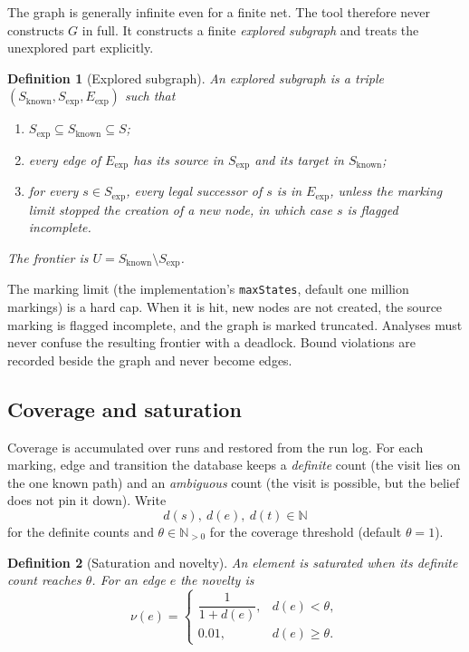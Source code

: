 \documentclass[11pt,a4paper]{article}
\newtheorem{definition}{Definition}[section]
\newcommand{\N}{\mathbb{N}}
\newcommand{\Npos}{\mathbb{N}_{>0}}
\begin{document}
The graph is generally infinite even for a finite net.  The tool therefore
never constructs $G$ in full.  It constructs a finite \emph{explored
subgraph} and treats the unexplored part explicitly.

\begin{definition}[Explored subgraph]\label{def:explored}
An explored subgraph is a triple $(S_{\mathrm{known}},S_{\mathrm{exp}},E_{\mathrm{exp}})$
such that
\begin{enumerate}[label=(\roman*),leftmargin=2.2em]
  \item $S_{\mathrm{exp}}\subseteq S_{\mathrm{known}}\subseteq S$;
  \item every edge of $E_{\mathrm{exp}}$ has its source in $S_{\mathrm{exp}}$
        and its target in $S_{\mathrm{known}}$;
  \item for every $s\in S_{\mathrm{exp}}$, every legal successor of $s$ is in
        $E_{\mathrm{exp}}$, unless the marking limit stopped the creation of
        a new node, in which case $s$ is flagged \emph{incomplete}.
\end{enumerate}
The \emph{frontier} is $U=S_{\mathrm{known}}\setminus S_{\mathrm{exp}}$.
\end{definition}

The marking limit (the implementation's \texttt{maxStates}, default one
million markings) is a hard cap.  When it is hit, new nodes are not created,
the source marking is flagged incomplete, and the graph is marked truncated.
Analyses must never confuse the resulting frontier with a deadlock.  Bound
violations are recorded beside the graph and never become edges.

\subsection{Coverage and saturation}

Coverage is accumulated over runs and restored from the run log.  For each
marking, edge and transition the database keeps a \emph{definite} count (the
visit lies on the one known path) and an \emph{ambiguous} count (the visit is
possible, but the belief does not pin it down).  Write
\[
  d(s),\ d(e),\ d(t)\in\N
\]
for the definite counts and $\theta\in\Npos$ for the coverage threshold
(default $\theta=1$).

\begin{definition}[Saturation and novelty]\label{def:saturation}
An element is \emph{saturated} when its definite count reaches $\theta$.  For
an edge $e$ the \emph{novelty} is
\[
  \nu(e)=
  \begin{cases}
    \dfrac{1}{1+d(e)}, & d(e)<\theta,\\[2mm]
    0.01, & d(e)\ge\theta.
  \end{cases}
\]
\end{definition}
\end{document}
